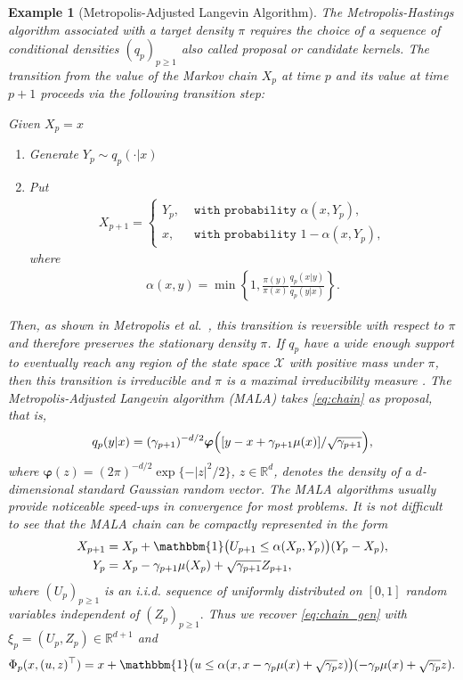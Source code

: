 \documentclass[preprint]{imsart}
\newtheorem{example}{Example}
\begin{document}
\begin{example}[Metropolis-Adjusted Langevin Algorithm]
The Metropolis-Hastings algorithm
associated with a target density \(\pi\) requires the choice of a sequence of conditional densities  \((q_p)_{p\geq 1}\) also called proposal or candidate kernels. The transition from the value  of the Markov chain \(X_p\)  at time \(p\)
and its value at time \(p + 1\) proceeds via the following transition step:

\begin{algorithm}[H]
Given \(X_p=x\)\;
\begin{enumerate}
\item Generate \(Y_p\sim q_p(\cdot|x)\)\;
\item Put
\begin{eqnarray*}
X_{p+1}=
\begin{cases}
Y_p, & \texttt{ with probability } \alpha(x,Y_p),
\\
x, &  \texttt{ with probability } 1-\alpha(x,Y_p),
\end{cases}
\end{eqnarray*}
where
\begin{eqnarray*}
\alpha(x,y)=\min\left\{1,\frac{\pi(y)}{\pi(x)}\frac{q_p(x|y)}{q_p(y|x)}\right\}.
\end{eqnarray*}
\end{enumerate}
\end{algorithm}
Then, as shown in Metropolis et al.~\cite{metropolis1953equation}, this transition is reversible with respect to \(\pi\) and therefore preserves the stationary density \(\pi\). If \(q_p\) have a wide enough
support to eventually reach any region
of the state space \(\mathcal{X}\) with positive mass
under \(\pi\), then this transition is irreducible and $\pi$ is a maximal irreducibility measure \cite{mengersen:tweedie:1996}. The  Metropolis-Adjusted Langevin algorithm (MALA) takes  \eqref{eq:chain} as proposal, that is,
\begin{eqnarray*}
q_p(y|x)=(\gamma_{p+1})^{-d/2}\boldsymbol{\varphi}\Bigl([y-x+\gamma_{p+1}\mu(x)]/\sqrt{\gamma_{p+1}}\Bigr),
\end{eqnarray*}
where
$\boldsymbol{\varphi}(z)=(2\pi)^{-d/2} \exp\{-|z|^2/2\}$,
$z\in\mathbb R^d$, denotes the density of a $d$-dimensional
standard Gaussian random vector.  The MALA algorithms usually provide noticeable speed-ups in convergence for most problems. It is not difficult to see that the MALA chain can be compactly represented in the form
\begin{align*}
X_{p+1} &=X_p+\mathbbm{1}\bigl(U_{p+1}\leq \alpha(X_{p},Y_{p})\bigr)(Y_{p}-X_p),  \\
Y_{p}&=X_p-\gamma_{p+1}\mu(X_p)+\sqrt{\gamma_{p+1}}Z_{p+1},
\end{align*}
where \((U_{p})_{p\geq 1}\) is an i.i.d. sequence of uniformly distributed on \([0,1]\) random variables independent of \((Z_p)_{p\geq 1}.\) Thus we recover \eqref{eq:chain_gen} with  \(\xi_p=(U_p,Z_p)\in \mathbb{R}^{d+1}\) and
\begin{eqnarray*}
\Phi_p(x,(u,z)^\top)=x+\mathbbm{1}\bigl(u\leq \alpha(x,x-\gamma_{p}\mu(x)+\sqrt{\gamma_{p}}z)\bigr)(-\gamma_{p}\mu(x)+\sqrt{\gamma_{p}}z).
\end{eqnarray*}
\end{example}
\end{document}
